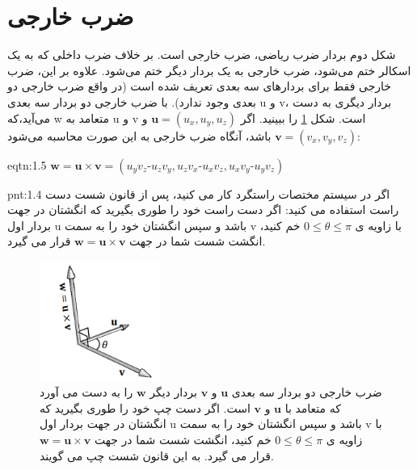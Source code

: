 \section{\textbf{ضرب خارجی}}
{
    \Large
    \begin{spacing}{1.5}
        شکل دوم بردار ضرب ریاضی، ضرب خارجی است.
        بر خلاف ضرب داخلی که به یک اسکالر ختم می‌شود، ضرب خارجی به یک بردار دیگر ختم می‌شود.
        علاوه بر این، ضرب خارجی فقط برای بردارهای سه بعدی تعریف شده است (در واقع ضرب خارجی دو بعدی وجود ندارد).
        با ضرب خارجی دو بردار سه بعدی u و v، بردار دیگری به دست می‌آید،که w متعامد به u و v است.
        شکل \ref{fig:4.Session.1.1.13} را ببینید.
        اگر $\textbf{u}=(u_{x},u_{y},u_{z})$ و  $\textbf{v}=(v_{x},v_{y},v_{z})$ باشد، آنگاه ضرب خارجی به این صورت محاسبه می‌شود:

        \begin{eqtn}{eqtn:1.5}
            \centering
            $\textbf{w}=\textbf{u}\times\textbf{v}=(u_{y}v_{z}\textbf{-}u_{z}v_{y}, u_{z}v_{x}\textbf{-}u_{x}v_{z}, u_{x}v_{y}\textbf{-}u_{y}v_{z})$
        \end{eqtn}

        \begin{point}{pnt:1.4}
            \Large
            اگر در سیستم مختصات راستگرد کار می کنید، پس از قانون شست دست راست استفاده می کنید:
            اگر دست راست خود را طوری بگیرید که انگشتان در جهت بردار اول u باشد و سپس انگشتان خود را به سمت v با زاویه ی $0\leq\theta\leq\pi$ خم کنید، انگشت شست شما در جهت $\textbf{w}=\textbf{u}\times\textbf{v}$ قرار می گیرد.
        \end{point}

        \begin{figure}[H]
            \centering
            \setlength{\belowcaptionskip}{-10pt}
            \includegraphics[width=0.35\textwidth]{Images/4/1/4.Session.1.1.13}
            \caption{ضرب خارجی دو بردار سه بعدی $\textbf{u}$ و $\textbf{v}$ بردار دیگر $\textbf{w}$ را به دست می آورد که متعامد با $\textbf{u}$ و $\textbf{v}$ است.
            اگر دست چپ خود را طوری بگیرید که انگشتان در جهت بردار اول u باشد و سپس انگشتان خود را به سمت v با زاویه ی $0\leq\theta\leq\pi$ خم کنید، انگشت شست شما در جهت $\textbf{w}=\textbf{u}\times\textbf{v}$ قرار می گیرد. به این قانون شست چپ می گویند.}
            \label{fig:4.Session.1.1.13}
        \end{figure}


\end{spacing}}
